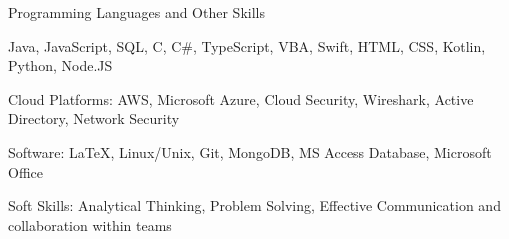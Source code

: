 \begin{cventries}
  \cventry
    {Programming Languages and Other Skills}
    { }
    { }
    { }
    {
      \begin{cvitems}
        \item {Java, JavaScript, SQL, C, C\#, TypeScript, VBA, Swift, HTML, CSS, Kotlin, Python, Node.JS}
        \item {Cloud Platforms: AWS, Microsoft Azure, Cloud Security, Wireshark, Active Directory, Network Security}
        \item {Software: LaTeX, Linux/Unix, Git, MongoDB, MS Access Database, Microsoft Office}
        \item {Soft Skills: Analytical Thinking, Problem Solving, Effective Communication and collaboration within teams}
      \end{cvitems}
    }
\end{cventries}
